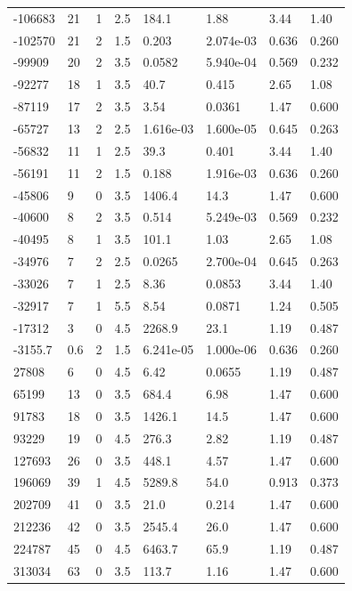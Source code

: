 \documentclass[preview]{standalone}
\begin{document}
{{\begin{tabular}{L{1.2cm}C{1.2cm} C{0.3cm}C{0.5cm} C{1.4cm}C{1.4cm} C{1.4cm}C{1.4cm}}
  -106683  &    21  & 1     & 2.5 &  184.1  & 1.88  & 3.44 &  1.40   \\ 
  -102570  &    21  & 2     & 1.5 &  0.203  & 2.074e-03  & 0.636 &  0.260   \\ 
  -99909  &    20  & 2     & 3.5 &  0.0582  & 5.940e-04  & 0.569 &  0.232   \\ 
  -92277  &    18  & 1     & 3.5 &  40.7  & 0.415  & 2.65 &  1.08   \\ 
  -87119  &    17  & 2     & 3.5 &  3.54  & 0.0361  & 1.47 &  0.600   \\ 
  -65727  &    13  & 2     & 2.5 &  1.616e-03  & 1.600e-05  & 0.645 &  0.263   \\ 
  -56832  &    11  & 1     & 2.5 &  39.3  & 0.401  & 3.44 &  1.40   \\ 
  -56191  &    11  & 2     & 1.5 &  0.188  & 1.916e-03  & 0.636 &  0.260   \\ 
  -45806  &     9  & 0     & 3.5 &  1406.4  & 14.3  & 1.47 &  0.600   \\ 
  -40600  &     8  & 2     & 3.5 &  0.514  & 5.249e-03  & 0.569 &  0.232   \\ 
  -40495  &     8  & 1     & 3.5 &  101.1  & 1.03  & 2.65 &  1.08   \\ 
  -34976  &     7  & 2     & 2.5 &  0.0265  & 2.700e-04  & 0.645 &  0.263   \\ 
  -33026  &     7  & 1     & 2.5 &  8.36  & 0.0853  & 3.44 &  1.40   \\ 
  -32917  &     7  & 1     & 5.5 &  8.54  & 0.0871  & 1.24 &  0.505   \\ 
  -17312  &     3  & 0     & 4.5 &  2268.9  & 23.1  & 1.19 &  0.487   \\ 
  -3155.7  &   0.6  & 2     & 1.5 &  6.241e-05  & 1.000e-06  & 0.636 &  0.260   \\ 
  27808  &     6  & 0     & 4.5 &  6.42  & 0.0655  & 1.19 &  0.487   \\ 
  65199  &    13  & 0     & 3.5 &  684.4  & 6.98  & 1.47 &  0.600   \\ 
  91783  &    18  & 0     & 3.5 &  1426.1  & 14.5  & 1.47 &  0.600   \\ 
  93229  &    19  & 0     & 4.5 &  276.3  & 2.82  & 1.19 &  0.487   \\ 
  127693  &    26  & 0     & 3.5 &  448.1  & 4.57  & 1.47 &  0.600   \\ 
  196069  &    39  & 1     & 4.5 &  5289.8  & 54.0  & 0.913 &  0.373   \\ 
  202709  &    41  & 0     & 3.5 &  21.0  & 0.214  & 1.47 &  0.600   \\ 
  212236  &    42  & 0     & 3.5 &  2545.4  & 26.0  & 1.47 &  0.600   \\ 
  224787  &    45  & 0     & 4.5 &  6463.7  & 65.9  & 1.19 &  0.487   \\ 
  313034  &    63  & 0     & 3.5 &  113.7  & 1.16  & 1.47 &  0.600   \\ 
\hline 
\end{tabular} 

}}
\end{document}
